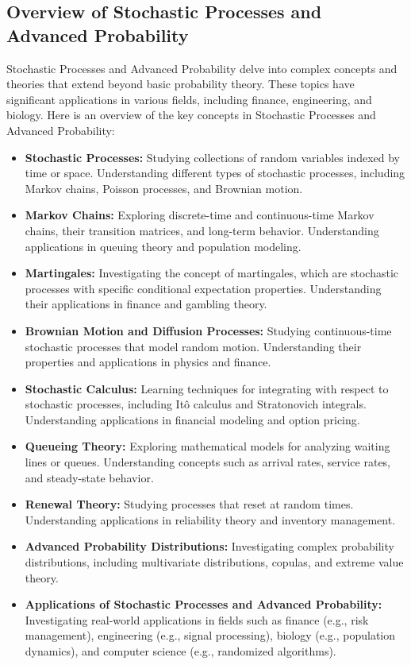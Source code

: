 \documentclass[openany]{book}
\begin{document}
\subsection{Overview of Stochastic Processes and Advanced Probability}
Stochastic Processes and Advanced Probability delve into complex concepts and theories that extend beyond basic probability theory. These topics have significant applications in various fields, including finance, engineering, and biology. Here is an overview of the key concepts in Stochastic Processes and Advanced Probability:
\begin{itemize}
    \item \textbf{Stochastic Processes:} Studying collections of random variables indexed by time or space. Understanding different types of stochastic processes, including Markov chains, Poisson processes, and Brownian motion.
    \item \textbf{Markov Chains:} Exploring discrete-time and continuous-time Markov chains, their transition matrices, and long-term behavior. Understanding applications in queuing theory and population modeling.
    \item \textbf{Martingales:} Investigating the concept of martingales, which are stochastic processes with specific conditional expectation properties. Understanding their applications in finance and gambling theory.
    \item \textbf{Brownian Motion and Diffusion Processes:} Studying continuous-time stochastic processes that model random motion. Understanding their properties and applications in physics and finance.
    \item \textbf{Stochastic Calculus:} Learning techniques for integrating with respect to stochastic processes, including Itô calculus and Stratonovich integrals. Understanding applications in financial modeling and option pricing.
    \item \textbf{Queueing Theory:} Exploring mathematical models for analyzing waiting lines or queues. Understanding concepts such as arrival rates, service rates, and steady-state behavior.
    \item \textbf{Renewal Theory:} Studying processes that reset at random times. Understanding applications in reliability theory and inventory management.
    \item \textbf{Advanced Probability Distributions:} Investigating complex probability distributions, including multivariate distributions, copulas, and extreme value theory.
    \item \textbf{Applications of Stochastic Processes and Advanced Probability:} Investigating real-world applications in fields such as finance (e.g., risk management), engineering (e.g., signal processing), biology (e.g., population dynamics), and computer science (e.g., randomized algorithms).

\end{itemize}
\end{document}

